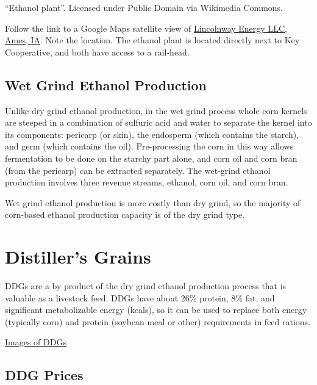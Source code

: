 \documentclass[]{book}
\theoremstyle{definition}
\theoremstyle{definition}
\theoremstyle{remark}
\begin{document}
``Ethanol plant''. Licensed under Public Domain via Wikimedia Commons.

Follow the link to a Google Maps satellite view of
\href{https://www.google.com/maps/place/Lincolnway+Energy+LLC/@42.0259566,-93.5094383,1084m/data=!3m1!1e3!4m2!3m1!1s0x0000000000000000:0xe75269d9c81692ab!6m1!1e1}{Lincolnway
Energy LLC, Ames, IA}. Note the location. The ethanol plant is located
directly next to Key Cooperative, and both have access to a rail-head.

\subsection{Wet Grind Ethanol
Production}\label{wet-grind-ethanol-production}

Unlike dry grind ethanol production, in the wet grind process whole corn
kernels are steeped in a combination of sulfuric acid and water to
separate the kernel into its components: pericarp (or skin), the
endosperm (which contains the starch), and germ (which contains the
oil). Pre-processing the corn in this way allows fermentation to be done
on the starchy part alone, and corn oil and corn bran (from the
pericarp) can be extracted separately. The wet-grind ethanol production
involves three revenue streams, ethanol, corn oil, and corn bran.

Wet grind ethanol production is more costly than dry grind, so the
majority of corn-based ethanol production capacity is of the dry grind
type.

\section{Distiller's Grains}\label{distillers-grains}

DDGs are a by product of the dry grind ethanol production process that
is valuable as a livestock feed. DDGs have about 26\% protein, 8\% fat,
and significant metabolizable energy (kcals), so it can be used to
replace both energy (typically corn) and protein (soybean meal or other)
requirements in feed rations.

\href{https://www.google.com/search?q=ddgs\&source=lnms\&tbm=isch\&sa=X\&ved=0ahUKEwj4udmomr7JAhWF2B4KHailApcQ_AUICCgC\&biw=1920\&bih=1031\#}{Images
of DDGs}

\subsection{DDG Prices}\label{ddg-prices}
\end{document}
